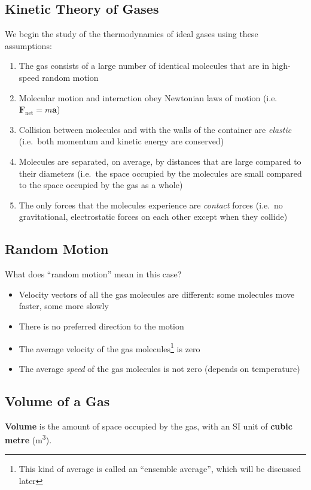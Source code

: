 \subsection{Kinetic Theory of Gases}
We begin the study of the thermodynamics of ideal gases using these assumptions:
\begin{enumerate}
\item The gas consists of a large number of identical molecules that are in
  high-speed random motion
\item Molecular motion and interaction obey Newtonian laws of motion (i.e.\
  $\bm F_\text{net}=m\bm a$)
\item Collision between molecules and with the walls of the container are
  \emph{elastic} (i.e.\ both momentum and kinetic energy are conserved)
\item Molecules are separated, on average, by distances that are large
  compared to their diameters (i.e.\ the space occupied by the molecules are
  small compared to the space occupied by the gas as a whole)
\item The only forces that the molecules experience are \emph{contact} forces
  (i.e.\ no gravitational, electrostatic forces on each other except when
  they collide)
\end{enumerate}
%
%
%
%
\subsection{Random Motion}
What does ``random motion'' mean in this case?
\begin{itemize}
\item Velocity vectors of all the gas molecules are different: some molecules
  move faster, some more slowly
\item There is no preferred direction to the motion
\item The average velocity of the gas molecules\footnote{This kind of average
is called an ``ensemble average'', which will be discussed later} is zero
\item The average \emph{speed} of the gas molecules is not zero (depends on
  temperature)
\end{itemize}


\subsection{Volume of a Gas}
\textbf{Volume} is the amount of space occupied by the gas, with an SI unit of
\textbf{cubic metre} (\si{\metre\cubed}).
%
%
%
%
